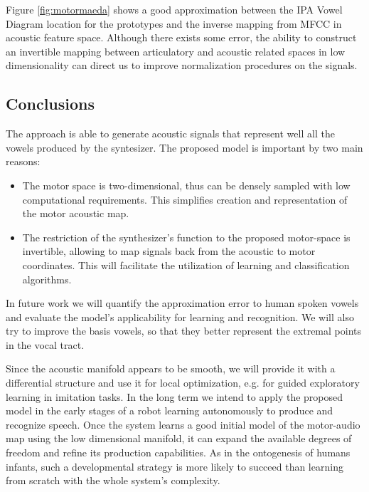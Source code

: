 Figure \ref{fig:motormaeda} shows a good approximation between the IPA
Vowel Diagram location for the prototypes and the inverse mapping from
MFCC in acoustic feature space. Although there exists some error, the
ability to construct an invertible mapping between articulatory and
acoustic related spaces in low dimensionality can direct us to improve
normalization procedures on the signals.

\subsection{Conclusions}
The approach is able to generate acoustic signals that represent well
all the vowels produced by the syntesizer.
The proposed model is important by two main reasons:
\begin{itemize}
\item The motor space is two-dimensional, thus can be densely sampled
  with low computational requirements.
  This simplifies creation and representation of the motor acoustic map.
\item The restriction of the synthesizer's function to the proposed
  motor-space is invertible, allowing to map signals back from the
  acoustic to motor coordinates. This will facilitate the utilization
  of learning and classification algorithms.
\end{itemize}
In future work we will quantify the approximation error to human
spoken vowels and evaluate the model's applicability for learning and
recognition. We will also try to improve the basis vowels, so that
they better represent the extremal points in the vocal tract.

Since the acoustic manifold appears to be smooth, we will provide it
with a differential structure and use it for local optimization,
e.g. for guided exploratory learning in imitation tasks. In the long
term we intend to apply the proposed model in the early stages of a
robot learning autonomously to produce and recognize speech. Once the
system learns a good initial model of the motor-audio map using the
low dimensional manifold, it can expand the available degrees of
freedom and refine its production capabilities. As in the ontogenesis
of humans infants, such a developmental strategy is more likely to
succeed than learning from scratch with the whole system's complexity.
\endinput

